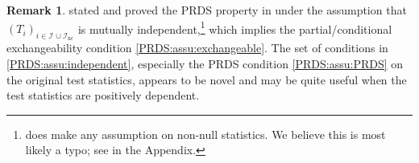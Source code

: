 \documentclass[a4paper,11pt]{article}
\theoremstyle{plain}
\theoremstyle{definition}
\newtheorem{remark}{Remark}
\def\calH{\mathcal{H}}
\def\calI{\mathcal{I}}
\theoremstyle{plain}
\newcommand{\pval}[1]{{p_{#1}}}
\newcommand{\testStatistics}[1]{{T_{#1}}}
\newcommand{\nickname}{{\text{RANC}}}
\newcommand{\hypothesis}[1]{{H_{#1}}}
\newcommand{\hypothesisIndex}[1]{{\calI_{#1}}}
\newcommand{\nullHypothesisSet}{{\calH_{0}}}
\newcommand{\PRDS}{{\text{PRDS}}}
\begin{document}

\begin{remark} \label{rem:bates-condition}
  \textcite[thm.\ 2]{bates21_testin_outlier_with_confor_p_values}
  stated and proved the PRDS property in  under the
  assumption that $\left(
    \testStatistics{i}  \right)_{i \in \hypothesisIndex{} \cup
    \hypothesisIndex{\text{nc}}}$ is mutually
  independent,\footnote{\textcite[thm.\
    2]{bates21_testin_outlier_with_confor_p_values} does make any
    assumption on non-null statistics. We believe this is most likely
    a typo; see \Cref{sec:bates-typo} in the Appendix.} which
  implies the partial/conditional exchangeability condition
  \ref{PRDS:assu:exchangeable}. The set of
  conditions in \ref{PRDS:assu:independent}, especially the PRDS condition
  \ref{PRDS:assu:PRDS} on the original test statistics, appears to be
  novel and may be quite useful when the test statistics are
  positively dependent.
\end{remark}
\end{document}
